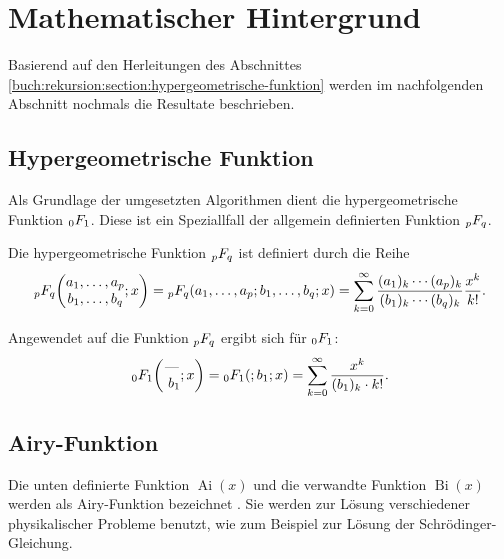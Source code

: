 %
%
%
\section{Mathematischer Hintergrund
\label{0f1:section:mathHintergrund}}
Basierend auf den Herleitungen des Abschnittes \ref{buch:rekursion:section:hypergeometrische-funktion} werden im nachfolgenden Abschnitt nochmals die Resultate beschrieben.

\subsection{Hypergeometrische Funktion
\label{0f1:subsection:hypergeometrisch}}
Als Grundlage der umgesetzten Algorithmen dient die hypergeometrische Funktion $\mathstrut_0F_1$. Diese ist ein Speziallfall der allgemein definierten Funktion $\mathstrut_pF_q$.
%

\begin{definition}
	\label{0f1:math:qFp:def}
	Die hypergeometrische Funktion
%
	$\mathstrut_pF_q$ ist definiert durch die Reihe
	\[
	\mathstrut_pF_q
	\biggl(
	\begin{matrix}
		a_1,\dots,a_p\\
		b_1,\dots,b_q
	\end{matrix}
	;
	x
	\biggr)
	=
	\mathstrut_pF_q(a_1,\dots,a_p;b_1,\dots,b_q;x)
	=
	\sum_{k=0}^\infty
	\frac{(a_1)_k\cdots(a_p)_k}{(b_1)_k\cdots(b_q)_k}\frac{x^k}{k!}.
	\]
\end{definition}

Angewendet auf die Funktion $\mathstrut_pF_q$ ergibt sich für $\mathstrut_0F_1$:
\begin{equation}
    \label{0f1:math:0f1:eq}
    \mathstrut_0F_1
    \biggl(
    \begin{matrix}
    \text{---}
    \\\
    b_1
    \end{matrix}
    ;
    x
    \biggr)
    =
    \mathstrut_0F_1(;b_1;x)
    =
    \sum_{k=0}^\infty
    \frac{x^k}{(b_1)_k \cdot k!}.
\end{equation}




\subsection{Airy-Funktion
\label{0f1:subsection:airy}}
Die unten definierte Funktion $\operatorname{Ai}(x)$ und die verwandte Funktion
$\operatorname{Bi}(x)$ werden als Airy-Funktion bezeichnet
\cite{0f1:wiki-airyFunktion}.
Sie werden zur Lösung verschiedener physikalischer Probleme benutzt,
wie zum Beispiel zur Lösung der Schrödinger-Gleichung.
%

